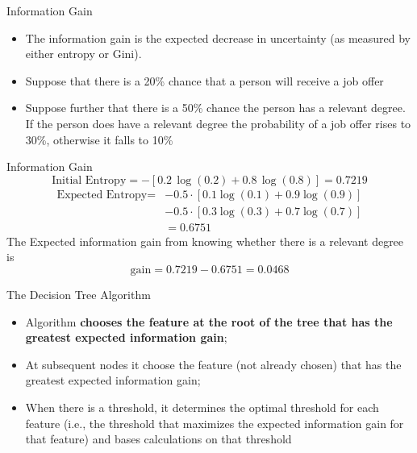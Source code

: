 \documentclass[11pt]{beamer}
\begin{document}
%
%
\begin{frame}{Information Gain}
	\begin{itemize}
		\item The information gain is the expected decrease in uncertainty (as measured by either entropy or Gini).
		\item Suppose that there is a 20\% chance that a person will receive a job offer 
		\item Suppose further that there is a 50\% chance the person has a relevant degree. If the person does have a relevant degree the probability of a job offer rises to 30\%, otherwise it falls to 10\%
	\end{itemize}
\end{frame}
%
%
\begin{frame}{Information Gain}
$$\text{Initial Entropy} = -[0.2\,\log(0.2) + 0.8\,\log(0.8)]=0.7219$$
\vspace{0.5cm}
\begin{align*}\text{Expected Entropy} =&-0.5 \cdot [0.1 \log(0.1) + 0.9\log(0.9)]\\ &- 0.5 \cdot [0.3\log(0.3) + 0.7\log(0.7)] \\ &=0.6751\end{align*}    
The Expected information gain from knowing whether there is a relevant degree is $$ \text{gain}= 0.7219-0.6751=0.0468$$
\end{frame}
%
%
\begin{frame}{The Decision Tree Algorithm}
	\begin{itemize}
		\item Algorithm \textbf{chooses the feature at the root of the tree that has the greatest expected information gain};
		\item At subsequent nodes it choose the feature (not already chosen) that has the greatest expected information gain;
		\item When there is a threshold, it determines the optimal threshold for each feature (i.e., the threshold that maximizes the expected information gain for that feature) and bases calculations on that threshold 
	\end{itemize}
\end{frame}
%
%
\end{document}
